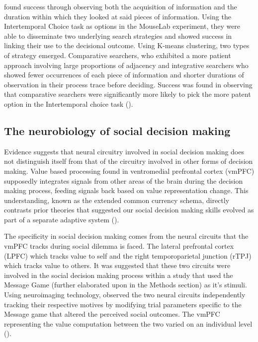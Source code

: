 \documentclass[man, floatsintext]{apa7}
\begin{document}
\citeauthor{reeckSearchPredictsChanges2017b} found success through observing both the acquisition of information and the duration within which they looked at said pieces of information. Using the Intertemporal Choice task as options in the MouseLab experiment, they were able to disseminate two underlying search strategies and showed success in linking their use to the decisional outcome. Using K-means clustering, two types of strategy emerged. Comparative searchers, who exhibited a more patient approach involving large proportions of adjacency and integrative searchers who showed fewer occurrences of each piece of information and shorter durations of observation in their process trace before deciding. Success was found in observing that comparative searchers were significantly more likely to pick the more patent option in the Intertemporal choice task (\cite{reeckSearchPredictsChanges2017b}). 


\subsection{The neurobiology of social decision making}


Evidence suggests that neural circuitry involved in social decision making does not distinguish itself from that of the circuitry involved in other forms of  decision making. Value based processing found in ventromedial prefrontal cortex (vmPFC) supposedly integrates signals from other areas of the brain during the decision making process, feeding signals back based on value representation change. This understanding, known as the extended common currency schema, directly contrasts prior theories that suggested our social decision making skills evolved as part of a separate adaptive system (\cite{ruffNeurobiologyRewardsValues2014}).

The specificity in social decision making comes from the neural circuits that the vmPFC tracks during social dilemma is faced. The lateral prefrontal cortex (LPFC) which tracks value to self and the right temporoparietal junction (rTPJ) which tracks value to others. It was suggested that these two circuits were involved in the social decision making process within a study that used the Message Game (further elaborated upon in the Methods section) as it's stimuli. Using neuroimaging technology, \citeauthor{shusterContributionSelfOtherregarding2020} observed the two neural circuits independently tracking their respective motives by modifying trial parameters specific to the Message game that altered the perceived social outcomes. The vmPFC representing the value computation between the two varied on an individual level (\cite{shusterContributionSelfOtherregarding2020}).
\end{document}
